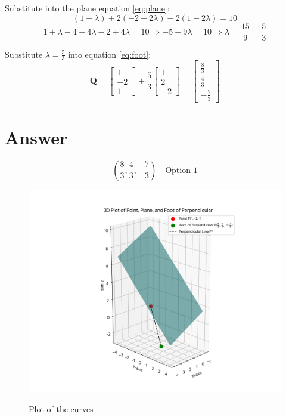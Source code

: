 \documentclass[journal]{IEEEtran}
\begin{document}
Substitute into the plane equation \eqref{eq:plane}:
\[
(1 + \lambda) + 2(-2 + 2\lambda) - 2(1 - 2\lambda) = 10
\]
\[
1 + \lambda -4 + 4\lambda -2 + 4\lambda = 10
\Rightarrow -5 + 9\lambda = 10 \Rightarrow \lambda = \frac{15}{9} = \frac{5}{3}
\]

Substitute \( \lambda = \frac{5}{3} \) into equation \eqref{eq:foot}:
\begin{equation}
\mathbf{Q} = \begin{bmatrix} 1 \\ -2 \\ 1 \end{bmatrix} + \frac{5}{3} \begin{bmatrix} 1 \\ 2 \\ -2 \end{bmatrix}
= \begin{bmatrix} \frac{8}{3} \\ \frac{4}{3} \\ -\frac{7}{3} \end{bmatrix}
\end{equation}

\section*{Answer}

\[
\boxed{
\left( \frac{8}{3}, \frac{4}{3}, -\frac{7}{3} \right)
}
\quad \text{Option 1}
\]








\begin{figure}[htbp]
\centering
\includegraphics[width=\columnwidth]{figs/python_plot.png} 
\caption*{Plot of the curves}
\label*{Fig1}
\end{figure}
\end{document}
